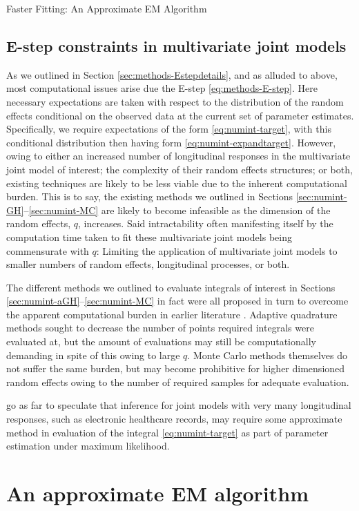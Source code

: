 \begin{chapter}{\label{cha:approx}Faster Fitting: An Approximate EM Algorithm}
\subsection{E-step constraints in multivariate joint models}\label{sec:approx-Estepmotiv}
As we outlined in Section \ref{sec:methods-Estepdetails}, and as alluded to above, most computational issues arise due the E-step \eqref{eq:methods-E-step}. Here necessary expectations are taken with respect to the distribution of the random effects conditional on the observed data at the current set of parameter estimates. Specifically, we require expectations of the form \eqref{eq:numint-target}, with this conditional distribution then having form \eqref{eq:numint-expandtarget}. However, owing to either an increased number of longitudinal responses in the multivariate joint model of interest; the complexity of their random effects structures; or both, existing techniques are likely to be less viable due to the inherent computational burden. This is to say, the existing methods we outlined in Sections \ref{sec:numint-GH}--\ref{sec:numint-MC} are likely to become infeasible as the dimension of the random effects, $q$, increases. Said intractability often manifesting itself by the computation time taken to fit these multivariate joint models being commensurate with $q$: Limiting the application of multivariate joint models to smaller numbers of random effects, longitudinal processes, or both. 

The different methods we outlined to evaluate integrals of interest in Sections \ref{sec:numint-aGH}--\ref{sec:numint-MC} in fact were all proposed in turn to overcome the apparent computational burden in earlier literature \eg \citet{Wulfsohn97}. Adaptive quadrature methods sought to decrease the number of points required integrals were evaluated at, but the amount of evaluations may still be computationally demanding in spite of this owing to large $q$. Monte Carlo methods themselves do not suffer the same burden, but may become prohibitive for higher dimensioned random effects owing to the number of required samples for adequate evaluation. 

\citet{Hickey2018} go as far to speculate that inference for joint models with very many longitudinal responses, such as electronic healthcare records, may require some approximate method in evaluation of the integral \eqref{eq:numint-target} as part of parameter estimation under maximum likelihood.

\section{An approximate EM algorithm}\label{sec:approx-approx}

\end{chapter}
